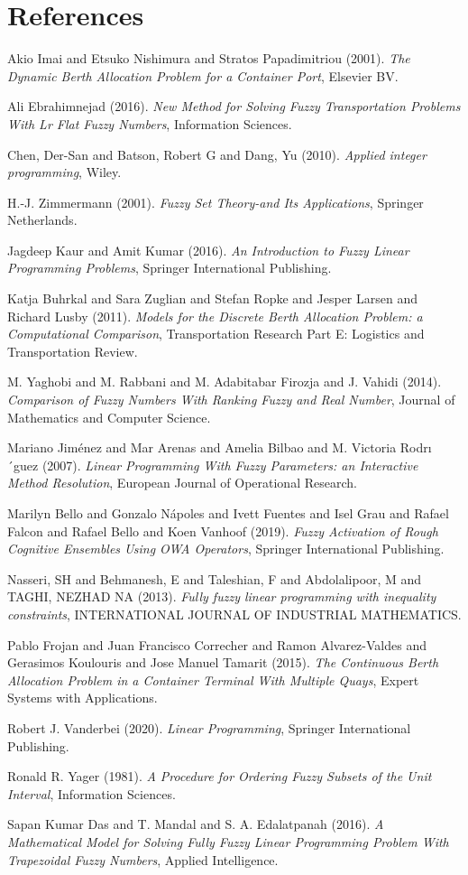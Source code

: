 \documentclass[11pt,a4paper,final]{article}
\begin{document}
\section{References}
\label{sec:org0202c6f}
\noindent
Akio Imai and Etsuko Nishimura and Stratos Papadimitriou (2001). \emph{The Dynamic Berth Allocation Problem for a Container Port}, Elsevier {BV}.

\noindent
Ali Ebrahimnejad (2016). \emph{New Method for Solving Fuzzy Transportation Problems With Lr Flat Fuzzy Numbers}, Information Sciences.

\noindent
Chen, Der-San and Batson, Robert G and Dang, Yu (2010). \emph{Applied integer programming}, Wiley.

\noindent
H.-J. Zimmermann (2001). \emph{Fuzzy Set Theory-and Its Applications}, Springer Netherlands.

\noindent
Jagdeep Kaur and Amit Kumar (2016). \emph{An Introduction to Fuzzy Linear Programming Problems}, Springer International Publishing.

\noindent
Katja Buhrkal and Sara Zuglian and Stefan Ropke and Jesper Larsen and Richard Lusby (2011). \emph{Models for the Discrete Berth Allocation Problem: a Computational Comparison}, Transportation Research Part E: Logistics and Transportation Review.

\noindent
M. Yaghobi and M. Rabbani and M. Adabitabar Firozja and J. Vahidi (2014). \emph{Comparison of Fuzzy Numbers With Ranking Fuzzy and Real Number}, Journal of Mathematics and Computer Science.

\noindent
Mariano Jim{\'e}nez and Mar Arenas and Amelia Bilbao and M. Victoria Rodrı´guez (2007). \emph{Linear Programming With Fuzzy Parameters: an Interactive Method Resolution}, European Journal of Operational Research.

\noindent
Marilyn Bello and Gonzalo N{\'a}poles and Ivett Fuentes and Isel Grau and Rafael Falcon and Rafael Bello and Koen Vanhoof (2019). \emph{Fuzzy Activation of Rough Cognitive Ensembles Using OWA Operators}, Springer International Publishing.

\noindent
Nasseri, SH and Behmanesh, E and Taleshian, F and Abdolalipoor, M and TAGHI, NEZHAD NA (2013). \emph{Fully fuzzy linear programming with inequality constraints}, INTERNATIONAL JOURNAL OF INDUSTRIAL MATHEMATICS.

\noindent
Pablo Frojan and Juan Francisco Correcher and Ramon Alvarez-Valdes and Gerasimos Koulouris and Jose Manuel Tamarit (2015). \emph{The Continuous Berth Allocation Problem in a Container Terminal With Multiple Quays}, Expert Systems with Applications.

\noindent
Robert J. Vanderbei (2020). \emph{Linear Programming}, Springer International Publishing.

\noindent
Ronald R. Yager (1981). \emph{A Procedure for Ordering Fuzzy Subsets of the Unit Interval}, Information Sciences.

\noindent
Sapan Kumar Das and T. Mandal and S. A. Edalatpanah (2016). \emph{A Mathematical Model for Solving Fully Fuzzy Linear Programming Problem With Trapezoidal Fuzzy Numbers}, Applied Intelligence.
\end{document}
